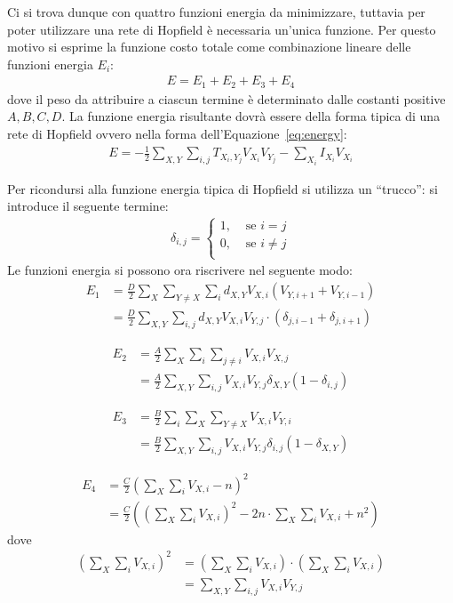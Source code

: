 Ci si trova dunque con quattro funzioni energia da minimizzare, tuttavia per poter utilizzare una rete di Hopfield è necessaria un'unica funzione. Per questo motivo si esprime la funzione costo totale come combinazione lineare delle funzioni energia $E_i$:
\begin{align}
	E = E_1 + E_2 + E_3 + E_4
\end{align}
dove il peso da attribuire a ciascun termine è determinato dalle costanti positive $A, B, C, D$. La funzione energia risultante dovrà essere della forma tipica di una rete di Hopfield ovvero nella forma dell'Equazione~\eqref{eq:energy}:
\begin{align*}
	E = - \frac{1}{2} \sum_{X, Y} \sum_{i, j} T_{X_i, Y_j} V_{X_i} V_{Y_j} - \sum_{X_i} I_{X_i} V_{X_i}
\end{align*}

\newpage

Per ricondursi alla funzione energia tipica di Hopfield si utilizza un “trucco”: si introduce il seguente termine:
\begin{align*}
	\delta_{i,j} =
	\begin{cases}
		1, &\text{ se } i = j\\
		0, &\text{ se } i \neq j \\
	\end{cases}
\end{align*}
Le funzioni energia si possono ora riscrivere nel seguente modo:
\begin{align*}
	E_1 &= \frac{D}{2} \sum_X \sum_{Y \neq X} \sum_i d_{X,Y} V_{X,i} (V_{Y, i+1} + V_{Y, i-1}) \\
	&=  \frac{D}{2} \sum_{X,Y} \sum_{i,j} d_{X,Y} V_{X,i} V_{Y,j} \cdot (\delta_{j, i-1} + \delta_{j, i+1})
\end{align*}

\begin{align*}
	E_2 &= \frac{A}{2} \sum_X \sum_i \sum_{j \neq i} V_{X,i} V_{X,j} \\
	&= \frac{A}{2} \sum_{X,Y} \sum_{i,j} V_{X,i} V_{Y,j} \delta_{X,Y} (1 - \delta_{i,j})
\end{align*}

\begin{align*}
	E_3 &= \frac{B}{2} \sum_i \sum_X \sum_{Y \neq X} V_{X,i} V_{Y,i} \\
	&= \frac{B}{2} \sum_{X,Y} \sum_{i,j} V_{X,i} V_{Y,j} \delta_{i,j} (1 - \delta_{X,Y})
\end{align*}

\begin{align*}
	E_4 &= \frac{C}{2}\left(\sum_X \sum_i V_{X,i} - n \right)^2 \\
	&= \frac{C}{2} \left(\left(\sum_X \sum_i V_{X,i}\right)^2 - 2n \cdot \sum_X \sum_i V_{X,i} + n^2 \right)
\end{align*}
dove
\begin{align*}
	\left(\sum_X \sum_i V_{X,i}\right)^2 &= \left(\sum_X \sum_i V_{X,i}\right) \cdot \left(\sum_X \sum_i V_{X,i} \right) \\
	&= \sum_{X,Y} \sum_{i,j} V_{X,i} V_{Y,j}
\end{align*}

